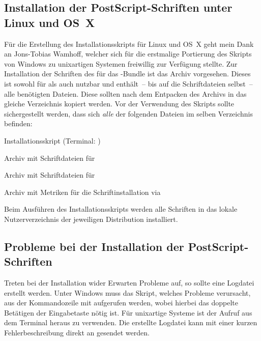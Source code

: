 \subsection{Installation der PostScript-Schriften unter Linux und OS~X}
\label{sec:install:fonts:unix}
Für die Erstellung des Installationsskripts für Linux und OS~X geht mein Dank 
an Jons-Tobias Wamhoff, welcher sich für die erstmalige Portierung des Skripts 
von Windows zu unixartigen Systemen freiwillig zur Verfügung stellte.
Zur Installation der Schriften des \CDs für das \TUDScript-Bundle ist das Archiv
%
{} vorgesehen. Dieses ist sowohl für 
 als auch  
nutzbar und enthält~-- bis auf die Schriftdateien selbst~-- alle benötigten 
Dateien. Diese sollten nach dem Entpacken des Archivs in das gleiche 
Verzeichnis kopiert werden. Vor der Verwendung des Skripts 
 sollte sichergestellt werden, dass sich 
\emph{alle} der folgenden Dateien im selben Verzeichnis befinden:
%
%
\begin{description}[labelwidth=\tempdim,labelsep=1em]
  \item[\File{tudscrfonts\_install.sh}]Installationsskript
    (Terminal: )
  \item[\File{Univers\_PS.zip}]Archiv mit Schriftdateien für \Univers
  \item[\File{DIN\_Bd\_PS.zip}]Archiv mit Schriftdateien für \DIN
  \item[\File{tudscrfonts.zip}]Archiv mit Metriken für die
    Schriftinstallation via 
\end{description}
%
Beim Ausführen des Installationsskripts werden alle Schriften in das lokale 
Nutzerverzeichnis der jeweiligen Distribution installiert.


\subsection{Probleme bei der Installation der PostScript-Schriften}
Treten bei der Installation wider Erwarten Probleme auf, so sollte eine 
Logdatei erstellt werden. Unter Windows muss das Skript, welches Probleme 
verursacht, aus der Kommandozeile mit
 aufgerufen werden, wobei hierbei 
das doppelte Betätigen der Eingabetaste nötig ist. Für unixartige Systeme 
ist der Aufruf  aus dem Terminal 
heraus zu verwenden. Die erstellte Logdatei kann mit einer kurzen 
Fehlerbeschreibung direkt an \Email{\tudscrmail} gesendet werden.



